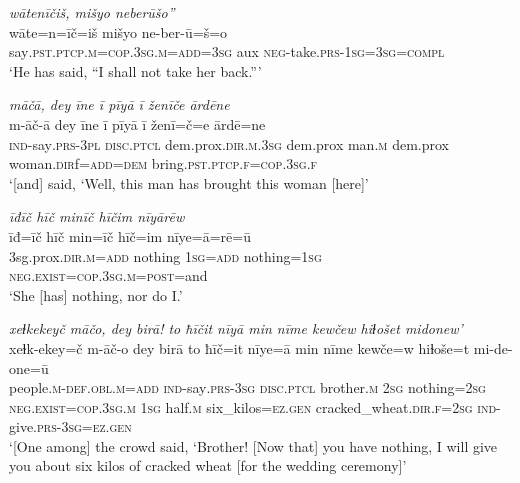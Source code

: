 \ea \label{ZP.108}
\textit{wātenīčiš, mišyo neberūšo”} \\ 
\gll wāte=n=īč=iš mišyo ne-ber-ū=š=o \\ 
 say\textsc{.pst}\textsc{.ptcp}\textsc{.m}\textsc{=cop}\textsc{.3sg}\textsc{.m}\textsc{=add}\textsc{=3sg} aux \textsc{neg-}take\textsc{.prs}\textsc{-\textsc{1sg}}\textsc{=3sg}\textsc{=compl} \\ 
\glt `He has said, “I shall not take her back.”'
\z 
 
\ea \label{ZP.115}
\textit{māčā, dey īne ī pīyā ī ženīče ārdēne} \\ 
\gll m-āč-ā dey īne ī pīyā ī ženī=č=e ārdē=ne \\ 
 \textsc{ind-}say\textsc{.prs}\textsc{-3pl} \textsc{disc.ptcl} dem.prox\textsc{.dir}\textsc{.m}\textsc{.3sg} dem.prox man\textsc{.m} dem.prox woman\textsc{.dir}f\textsc{=add}\textsc{=dem} bring\textsc{.pst}\textsc{.ptcp}\textsc{.f}\textsc{=cop}\textsc{.3sg}\textsc{.f} \\ 
\glt `[and] said, ‘Well, this man has brought this woman [here]'
\z 
 
\ea \label{ZP.117}
\textit{īđīč hīč minīč hīčim nīyārēw} \\ 
\gll īđ=īč hīč min=īč hīč=im nīye=ā=rē=ū \\ 
 3sg.prox\textsc{.dir}\textsc{.m}\textsc{=add} nothing \textsc{1sg}\textsc{=add} nothing\textsc{=\textsc{1sg}} \textsc{\textsc{neg.}exist}\textsc{=cop}\textsc{.3sg}\textsc{.m}\textsc{=\textsc{post}}=and \\ 
\glt `She [has] nothing, nor do I.'
\z 
 
\ea \label{ZP.118}
\textit{xeɫkekeyč māčo, dey birā! to ħīčit nīyā min nīme kewčew hiɫošet midonew’} \\ 
\gll xeɫk-ekey=č m-āč-o dey birā to ħīč=it nīye=ā min nīme kewče=w hiɫoše=t mi-de-one=ū \\ 
 people\textsc{.m}\textsc{-def}\textsc{.obl}\textsc{.m}\textsc{=add} \textsc{ind-}say\textsc{.prs}\textsc{-3sg} \textsc{disc.ptcl} brother\textsc{.m} \textsc{2sg} nothing\textsc{=\textsc{2sg}} \textsc{\textsc{neg.}exist}\textsc{=cop}\textsc{.3sg}\textsc{.m} \textsc{1sg} half\textsc{.m} six\_kilos\textsc{\textsc{=ez.gen}} cracked\_wheat\textsc{.dir}\textsc{.f}\textsc{=\textsc{2sg}} \textsc{ind-}give\textsc{.prs}\textsc{-3sg}\textsc{\textsc{=ez.gen}} \\ 
\glt `[One among] the crowd said, ‘Brother! [Now that] you have nothing, I will give you about six kilos of cracked wheat [for the wedding ceremony]'
\z 
 
